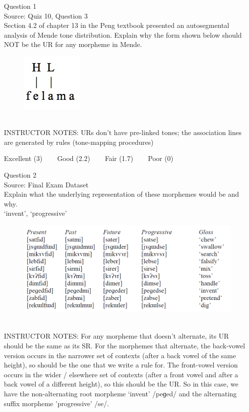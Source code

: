 \documentclass[12pt]{article}
\begin{document}
{\large Question 1}\\

Source: Quiz 10, Question 3\\

Section 4.2 of chapter 13 in the Peng textbook presented an autosegmental analysis of Mende tone distribution. Explain why the form shown below should NOT be the UR for any morpheme in Mende.\\

\begin{figure}[H]
\includegraphics{../images/mende_junction_a.png}
\end{figure}

~\\
INSTRUCTOR NOTES: URs don't have pre-linked tones; the association lines are generated by rules (tone-mapping procedures)


\vfill
Excellent (3) ~~~ Good (2.2) ~~~ Fair (1.7) ~~~ Poor (0)
\newpage

{\large Question 2}\\

Source: Final Exam Dataset\\

Explain what the underlying representation of these morphemes would be and why.\\

`invent', `progressive'

\begin{figure}[H]
\includegraphics{../images/final_dataset.png}
\end{figure}

~\\
INSTRUCTOR NOTES: For any morpheme that doesn’t alternate, its UR should be the same as its SR.  For the morphemes that alternate, the back-vowel version occurs in the narrower set of contexts (after a back vowel of the same height), so should be the one that we write a rule for. The front-vowel version occurs in the wider / elsewhere set of contexts (after a front vowel and after a back vowel of a different height), so this should be the UR. So in this case, we have the non-alternating root morpheme ‘invent’ /peɡed/ and the alternating suffix morpheme 'progressive' /se/.
\end{document}

